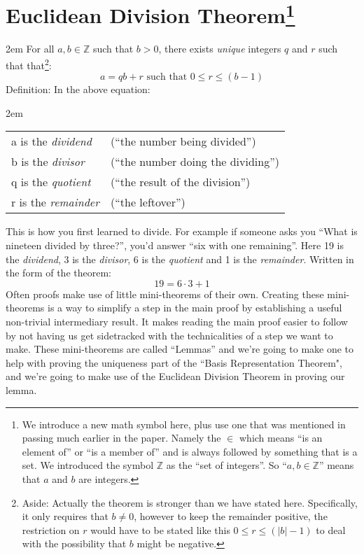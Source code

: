 \documentclass{article}
\newenvironment{jprIn}{\begin{adjustwidth}{2em}{}}{\end{adjustwidth}}
\begin{document}
\section*{Euclidean Division Theorem\footnote{We introduce a new math symbol here, plus use one that was
mentioned in passing much earlier in the paper.  Namely the $\in$ which means ``is an element of'' or
``is a member of'' and is always followed by something that is a set.  We introduced the symbol $\mathbb{Z}$ as the
``set of integers''.  So ``$a,b\in{}\mathbb{Z}$'' means that $a$ and $b$ are integers.}}
\begin{jprIn}
For all $a,b\in{}\mathbb{Z}$ such that $b>0$, there exists \emph{unique} integers $q$ and $r$ such
that
that\footnote{Aside: Actually the theorem is stronger than we have stated here. Specifically, it only requires that $b\ne0$, however
to keep the remainder positive, the restriction on $r$ would have to be stated like
this $0 \le r \le (\left|b\right|-1)$ to deal with the possibility that $b$ might be negative.}:
\[a=qb+r  \text{ such that } 0\le{}r\le{}(b-1)\]
Definition: In the above equation:
\begin{jprIn}
\begin{tabular}{l l}
a is the \emph{dividend} & (``the number being divided'')\\
b is the \emph{divisor} & (``the number doing the dividing'')\\
q is the \emph{quotient} & (``the result of the division'')\\
r is the \emph{remainder} & (``the leftover'')
\end{tabular}
\end{jprIn}
\end{jprIn}
This is how you first learned to divide.
For example if someone asks you ``What is nineteen divided by three?'', you’d
answer ``six with one remaining''. Here 19 is the \emph{dividend},  3 is the \emph{divisor},
6 is the \emph{quotient} and 1 is the \emph{remainder}. Written in the form of the theorem:
\[19=6\cdot3+1\]
Often proofs make use of little mini-theorems of their own.
Creating these mini-theorems is a way to simplify a step in
the main proof by establishing a useful non-trivial
intermediary result. It makes reading the main proof
easier to follow by not having us get sidetracked with
the technicalities of a step we want to make.
These mini-theorems are called ``Lemmas''
and we're going to make one to help with proving the uniqueness part
of the ``Basis Representation Theorem", and we're going to make use of the
Euclidean Division Theorem in proving our lemma.
\end{document}

